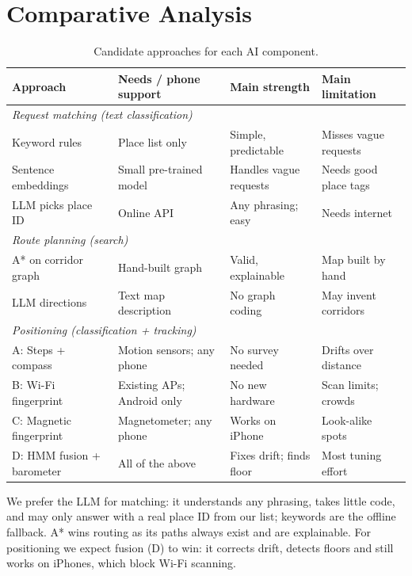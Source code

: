 \documentclass{article}
\begin{document}
\section{Comparative Analysis}
\begin{table}[h]
  \centering
  \caption{Candidate approaches for each AI component.}
  \label{tab:approach-comparison}
  \footnotesize
  \setlength{\tabcolsep}{3.5pt}
  \begin{tabular}{llll}
    \toprule
    Approach & Needs / phone support & Main strength & Main limitation \\
    \midrule
    \multicolumn{4}{l}{\textit{Request matching (text classification)}} \\
    Keyword rules & Place list only & Simple, predictable & Misses vague requests \\
    Sentence embeddings & Small pre-trained model & Handles vague requests & Needs good place tags \\
    LLM picks place ID & Online API & Any phrasing; easy & Needs internet \\
    \midrule
    \multicolumn{4}{l}{\textit{Route planning (search)}} \\
    A* on corridor graph & Hand-built graph & Valid, explainable & Map built by hand \\
    LLM directions & Text map description & No graph coding & May invent corridors \\
    \midrule
    \multicolumn{4}{l}{\textit{Positioning (classification + tracking)}} \\
    A: Steps + compass & Motion sensors; any phone & No survey needed & Drifts over distance \\
    B: Wi-Fi fingerprint & Existing APs; Android only & No new hardware & Scan limits; crowds \\
    C: Magnetic fingerprint & Magnetometer; any phone & Works on iPhone & Look-alike spots \\
    D: HMM fusion + barometer & All of the above & Fixes drift; finds floor & Most tuning effort \\
    \bottomrule
  \end{tabular}
\end{table}

We prefer the LLM for matching: it understands any phrasing, takes little code, and may only answer with a real place ID from our list; keywords are the offline fallback. A* wins routing as its paths always exist and are explainable. For positioning we expect fusion (D) to win: it corrects drift, detects floors and still works on iPhones, which block Wi-Fi scanning.
\end{document}
